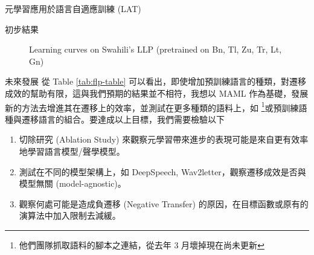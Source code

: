 \documentclass[12pt,UTF8,fntef]{article}
\begin{document}
\begin{section}{元學習應用於語言自適應訓練 (LAT)}
\begin{subsection}{初步結果}
\begin{figure}[ht]
  \centering
  \center \caption{Learning curves on Swahili's LLP (pretrained on Bn, Tl, Zu, Tr, Lt, Gn)}
  \label{fig:learning-curve}
\end{figure}
    \end{subsection}

    \begin{subsection}{未來發展}
      從 Table \ref{tab:flp-table} 可以看出，即使增加預訓練語言的種類，對遷移成效的幫助有限，這與我們預期的結果並不相符，我想以 MAML 作為基礎，發展新的方法去增進其在遷移上的效率，並測試在更多種類的語料上，如 \cite{black2019cmu} \footnote{他們團隊抓取語料的腳本之連結，從去年 3 月壞掉現在尚未更新}或預訓練語種與遷移語言的組合。要達成以上目標，我們需要檢驗以下
      \begin{enumerate}
        \item 切除研究 (Ablation Study) 來觀察元學習帶來進步的表現可能是來自更有效率地學習語言模型/聲學模型。
        \item 測試在不同的模型架構上，如 DeepSpeech, Wav2letter，觀察遷移成效是否與模型無關 (model-agnostic)。
        \item 觀察何處可能是造成負遷移 (Negative Transfer) 的原因，在目標函數或原有的演算法中加入限制去減緩。
      \end{enumerate}
    \end{subsection}
\end{section}
\end{document}
